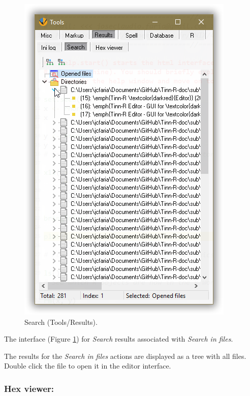 \begin{figure}[H]
  \includegraphics[scale=0.35]{./res/tools_results_search.png}
  \caption{Search (Tools/Results).}
  \label{fig:tools_results_search}
\end{figure}

The interface
(Figure \ref{fig:tools_results_search})
for \textit{Search} results associated with \textit{Search in files}.

The results for the \textit{Search in files} actions are displayed
as a tree with all files. Double click the file to open it in
the editor interface.


\subsubsection{Hex viewer:}
\\

